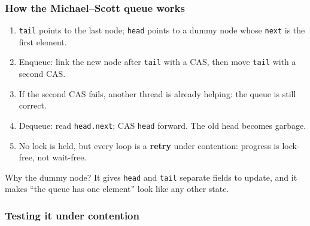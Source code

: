 \documentclass[aspectratio=169,10pt,compress]{beamer}
\begin{document}
\begin{frame}[t,fragile] \frametitle{How the Michael--Scott queue works}
  \begin{enumerate}\small
    \item \texttt{tail} points to the last node; \texttt{head} points to a dummy node whose \texttt{next} is the first element.
    \item Enqueue: link the new node after \texttt{tail} with a CAS, then move \texttt{tail} with a second CAS.
    \item If the second CAS fails, another thread is already helping: the queue is still correct.
    \item Dequeue: read \texttt{head.next}; CAS \texttt{head} forward. The old head becomes garbage.
    \item No lock is held, but every loop is a \textbf{retry} under contention: progress is lock-free, not wait-free.
  \end{enumerate}
  \vspace{0.3em}
  \begin{block}{Why the dummy node?}
    \small It gives \texttt{head} and \texttt{tail} separate fields to update, and it makes ``the queue has one element'' look like any other state.
  \end{block}
\end{frame}




\begin{frame}[t,fragile] \frametitle{Testing it under contention}
\end{frame}
\end{document}
